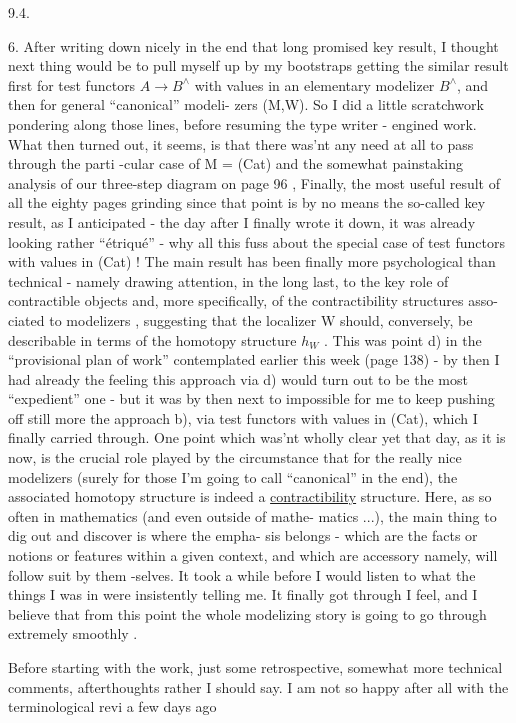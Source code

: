 
9.4.

6.     After writing down nicely\hand{,} in the end\hand{,} that long promised key
result,  I thought next thing would be to pull myself up by my bootstraps\unsure{,}
getting the similar result first for test functors $A\longrightarrow B^{\wedge}$ with values
in an elementary modelizer $B^{\wedge}$,  and then for general ``canonical'' modeli-%
zers (M,W).  So I did a little scratchwork pondering along those lines,
before resuming the type writer - engined work.  What then turned out,
it seems,  is that there was'nt any need at all to pass through the parti%
-cular case of M = (Cat) and the somewhat painstaking analysis of our 
three-step diagram on page 96 ,  Finally,  the most useful result of all
the eighty pages grinding\hand{,} since that point\hand{,} is by no means the so-called
key result,  as I anticipated  -  the day after I finally wrote it down,
it was already looking rather ``étriqué'' -  why all this fuss about 
the special case of  test functors with values in (Cat) !  The main
result has been finally more psychological than technical  -  namely
drawing attention,  in the long last,  to the key role of contractible
objects and,  more specifically,  of the contractibility structures asso-%
ciated to modelizers , suggesting that the localizer W  should,
conversely,  be describable in terms of the homotopy structure $h_{W}$ .  This
was point d)  in the ``provisional plan of work'' contemplated earlier this
week (page 138)  -  by then I had already the feeling this approach via
d)  would turn out to be the most ``expedient'' one  -  but it was by then
next to impossible for me to keep pushing off still more the approach b),
 via test functors with values in (Cat),  which I finally carried
through.  One point which was'nt wholly clear yet that day,  as it is
now,  is the crucial role played by the circumstance that for the really
nice modelizers (surely for those I'm going to call ``canonical'' in the
end),  the associated homotopy structure is indeed a \uline{contractibility}
structure.  Here,  as so often in mathematics (and even outside of mathe-%
matics ...),  the main thing to dig out and discover is where the empha-%
sis belongs  -  which are the   facts or notions or features within a
given context,  and which are accessory\hand{,} namely,  will follow suit by them%
-selves.  It took a while before I would listen to what the things I was
in were insistently telling me.  It finally got through I feel,  and I
believe that from this point  the whole modelizing story is going to go
through extremely smoothly .

     Before starting with the work,  just some retrospective,  somewhat
more technical comments,  afterthoughts rather I should say.  I am not so
happy after all with the  terminological revi a few days ago

